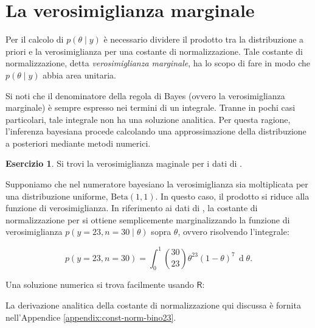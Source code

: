 \documentclass[
  11pt,
]{krantz}
\makeatletter
\newenvironment{Shaded}{\begin{snugshade}}{\end{snugshade}}
\newcommand{\AttributeTok}[1]{\textcolor[rgb]{0.61,0.61,0.61}{#1}}
\newcommand{\CommentTok}[1]{\textcolor[rgb]{0.37,0.37,0.37}{\textit{#1}}}
\newcommand{\ControlFlowTok}[1]{\textcolor[rgb]{0.27,0.27,0.27}{\textbf{#1}}}
\newcommand{\DecValTok}[1]{\textcolor[rgb]{0.06,0.06,0.06}{#1}}
\newcommand{\FunctionTok}[1]{\textcolor[rgb]{0,0,0}{#1}}
\newcommand{\NormalTok}[1]{#1}
\newcommand{\OtherTok}[1]{\textcolor[rgb]{0.37,0.37,0.37}{#1}}
\newcommand{\SpecialCharTok}[1]{\textcolor[rgb]{0,0,0}{#1}}
\newenvironment{kframe}{%
\medskip{}
\setlength{\fboxsep}{.8em}
 \def\at@end@of@kframe{}%
 \ifinner\ifhmode%
  \def\at@end@of@kframe{\end{minipage}}%
  \begin{minipage}{\columnwidth}%
 \fi\fi%
 \def\FrameCommand##1{\hskip\@totalleftmargin \hskip-\fboxsep
 \colorbox{shadecolor}{##1}\hskip-\fboxsep
     \hskip-\linewidth \hskip-\@totalleftmargin \hskip\columnwidth}%
 \MakeFramed {\advance\hsize-\width
   \@totalleftmargin\z@ \linewidth\hsize
   \@setminipage}}%
 {\par\unskip\endMakeFramed%
 \at@end@of@kframe}
\renewenvironment{Shaded}{\begin{kframe}}{\end{kframe}}
\newcommand{\R}{\textsf{R}} %
\theoremstyle{definition}
\theoremstyle{definition}
\theoremstyle{definition}
\newtheorem{exercise}{Esercizio}[chapter]
\theoremstyle{definition}
\theoremstyle{remark}
\makeatother
\begin{document}
\hypertarget{sec:const-normaliz-bino23}{%
\section{La verosimiglianza marginale}\label{sec:const-normaliz-bino23}}

Per il calcolo di \(p(\theta \mid y)\) è necessario dividere il prodotto tra la distribuzione a priori e la verosimiglianza per una costante di normalizzazione. Tale costante di normalizzazione, detta \emph{verosimiglianza marginale}, ha lo scopo di fare in modo che \(p(\theta \mid y)\) abbia area unitaria.

Si noti che il denominatore della regola di Bayes (ovvero la verosimiglianza marginale) è sempre espresso nei termini di un integrale. Tranne in pochi casi particolari, tale integrale non ha una soluzione analitica. Per questa ragione, l'inferenza bayesiana procede calcolando una approssimazione della distribuzione a posteriori mediante metodi numerici.

\begin{exercise}
Si trovi la verosimiglianza maginale per i dati di \citet{zetschefuture2019}.

Supponiamo che nel numeratore bayesiano la verosimiglianza sia moltiplicata per una distribuzione uniforme, \(\mbox{Beta}(1, 1)\). In questo caso, il prodotto si riduce alla funzione di verosimiglianza. In riferimento ai dati di \citet{zetschefuture2019}, la costante di normalizzazione per si ottiene semplicemente marginalizzando la funzione di verosimiglianza \(p(y = 23, n = 30 \mid \theta)\) sopra \(\theta\), ovvero risolvendo l'integrale:

\begin{equation}
p(y = 23, n = 30) = \int_0^1 \binom{30}{23} \theta^{23} (1-\theta)^{7} \,\operatorname {d}\!\theta.
\label{eq:intlikebino23}
\end{equation}

Una soluzione numerica si trova facilmente usando \(\R\):

\begin{Shaded}
\end{Shaded}

La derivazione analitica della costante di normalizzazione qui discussa è fornita nell'Appendice \ref{appendix:const-norm-bino23}.
\end{exercise}
\end{document}

